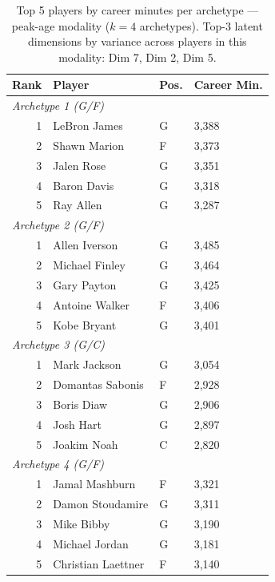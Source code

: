 \begin{table}[htbp]
  \centering\small
  \begin{tabular}{rlll}
    \toprule
    Rank & Player & Pos. & Career Min. \\
    \midrule
    \multicolumn{4}{l}{\textit{Archetype 1 (G/F)}} \\
    \midrule
    1 & LeBron James & G & 3,388 \\
    2 & Shawn Marion & F & 3,373 \\
    3 & Jalen Rose & G & 3,351 \\
    4 & Baron Davis & G & 3,318 \\
    5 & Ray Allen & G & 3,287 \\
    \midrule[0.4pt]
    \multicolumn{4}{l}{\textit{Archetype 2 (G/F)}} \\
    \midrule
    1 & Allen Iverson & G & 3,485 \\
    2 & Michael Finley & G & 3,464 \\
    3 & Gary Payton & G & 3,425 \\
    4 & Antoine Walker & F & 3,406 \\
    5 & Kobe Bryant & G & 3,401 \\
    \midrule[0.4pt]
    \multicolumn{4}{l}{\textit{Archetype 3 (G/C)}} \\
    \midrule
    1 & Mark Jackson & G & 3,054 \\
    2 & Domantas Sabonis & F & 2,928 \\
    3 & Boris Diaw & G & 2,906 \\
    4 & Josh Hart & G & 2,897 \\
    5 & Joakim Noah & C & 2,820 \\
    \midrule[0.4pt]
    \multicolumn{4}{l}{\textit{Archetype 4 (G/F)}} \\
    \midrule
    1 & Jamal Mashburn & F & 3,321 \\
    2 & Damon Stoudamire & G & 3,311 \\
    3 & Mike Bibby & G & 3,190 \\
    4 & Michael Jordan & G & 3,181 \\
    5 & Christian Laettner & F & 3,140 \\
    \bottomrule
  \end{tabular}
  \caption{Top 5 players by career minutes per archetype --- peak-age modality ($k=4$ archetypes). Top-3 latent dimensions by variance across players in this modality: Dim 7, Dim 2, Dim 5.}
  \label{tab:arch_reps_peak_age}
\end{table}

